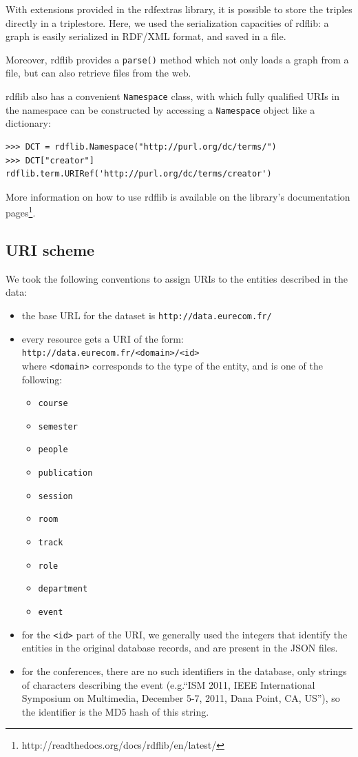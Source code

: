 \documentclass[a4paper,11pt]{report}
\begin{document}
With extensions provided in the rdfextras library, it is possible to store the triples directly in a triplestore. Here, we used the serialization capacities of rdflib: a graph is easily serialized in RDF/XML format, and saved in a file.

 Moreover, rdflib provides a \texttt{parse()} method which not only loads a graph from a file, but can also retrieve files from the web. 

rdflib also has a convenient \texttt{Namespace} class, with which fully qualified URIs in the namespace can be constructed by accessing a \texttt{Namespace} object like a dictionary:
\begin{verbatim}
>>> DCT = rdflib.Namespace("http://purl.org/dc/terms/")
>>> DCT["creator"]
rdflib.term.URIRef('http://purl.org/dc/terms/creator')
\end{verbatim}

More information on how to use rdflib is available on the library's documentation pages\footnote{http://readthedocs.org/docs/rdflib/en/latest/}.

\subsection{URI scheme}
We took the following conventions to assign URIs to the entities described in the data:
\begin{itemize}
\item the base URL for the dataset is \texttt{http://data.eurecom.fr/}
\item every resource gets a URI of the form: \\\texttt{http://data.eurecom.fr/<domain>/<id>}  \\where \texttt{<domain>} corresponds to the type of the entity, and is one of the following:
\begin{itemize}
\item \texttt{course}
\item \texttt{semester}
\item \texttt{people}
\item \texttt{publication}
\item \texttt{session}
\item \texttt{room}
\item \texttt{track}
\item \texttt{role}
\item \texttt{department}
\item \texttt{event}
\end{itemize}
\item for the  \texttt{<id>} part of the URI, we generally used the integers that identify the entities in the original database records, and are present in the JSON files. 
\item for the conferences, there are no such identifiers in the database, only strings of characters describing the event (e.g.``ISM 2011, IEEE International Symposium on Multimedia, December 5-7, 2011, Dana Point, CA, US''), so the identifier is the MD5 hash of this string.
\end{itemize}
\end{document}
